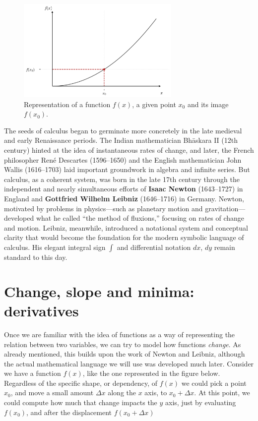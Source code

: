 \documentclass{book}
\begin{document}
\begin{figure}[ht]
    \centering
    \includegraphics[width=0.7\textwidth]{figures/appendix/functions_point_1.png}
    \caption{Representation of a function $f(x)$, a given point $x_0$ and its image $f(x_0)$.}
    \label{fig:functions_point_1}
\end{figure}

The seeds of calculus began to germinate more concretely in the late medieval and early Renaissance periods. The Indian mathematician Bhāskara II (12th century) hinted at the idea of instantaneous rates of change, and later, the French philosopher René Descartes (1596--1650) and the English mathematician John Wallis (1616--1703) laid important groundwork in algebra and infinite series. But calculus, as a coherent system, was born in the late 17th century through the independent and nearly simultaneous efforts of \textbf{Isaac Newton} (1643--1727) in England and \textbf{Gottfried Wilhelm Leibniz} (1646--1716) in Germany. Newton, motivated by problems in physics---such as planetary motion and gravitation---developed what he called ``the method of fluxions,'' focusing on rates of change and motion. Leibniz, meanwhile, introduced a notational system and conceptual clarity that would become the foundation for the modern symbolic language of calculus. His elegant integral sign $\int$ and differential notation $dx$, $dy$ remain standard to this day.\\

\section{Change, slope and minima: derivatives}

Once we are familiar with the idea of functions as a way of representing the relation between two variables, we can try to model how functions \textit{change}. As already mentioned, this builds upon the work of Newton and Leibniz, although the actual mathematical language we will use was developed much later. Consider we have a function $f(x)$, like the one represented in the figure below. Regardless of the specific shape, or dependency, of $f(x)$ we could pick a point $x_0$, and move a small amount $\Delta x$ along the $x$ axis, to $x_0 + \Delta x$. At this point, we could compute how much that change impacts the $y$ axis, just by evaluating $f(x_0)$, and after the displacement $f(x_0 + \Delta x)$
\end{document}
